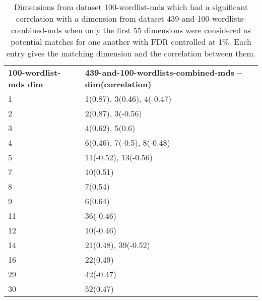 \begin{table}[!tbp]
    \begin{tabular}{| ll |}
        \hline
        \textbf{100-wordlist-mds dim} & \textbf{439-and-100-wordlists-combined-mds -- dim(correlation)}\\
        1 & 1(0.87), 3(0.46), 4(-0.47)\\
        2 & 2(0.87), 3(-0.56)\\
        3 & 4(0.62), 5(0.6)\\
        4 & 6(0.46), 7(-0.5), 8(-0.48)\\
        5 & 11(-0.52), 13(-0.56)\\
        7 & 10(0.51)\\
        8 & 7(0.54)\\
        9 & 6(0.64)\\
        11 & 36(-0.46)\\
        12 & 10(-0.46)\\
        14 & 21(0.48), 39(-0.52)\\
        16 & 22(0.49)\\
        29 & 42(-0.47)\\
        30 & 52(0.47)\\
        \hline
    \end{tabular}
    \caption{Dimensions from dataset 100-wordlist-mds which had a significant correlation with a dimension from dataset 439-and-100-wordlists-combined-mds when only the first 55 dimensions were considered as potential matches for one another with FDR controlled at 1\%. Each entry gives the matching dimension and the correlation between them.}
    \label{100-vs-439and100-from-800dim-lowercase-wmt-model-significant-first-55.tex}
\end{table}
